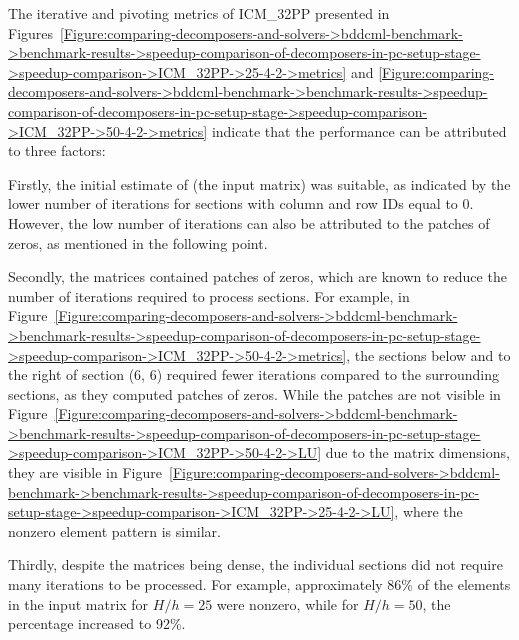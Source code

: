 The iterative and pivoting metrics of ICM\_32PP presented in Figures~\ref{Figure:comparing-decomposers-and-solvers->bddcml-benchmark->benchmark-results->speedup-comparison-of-decomposers-in-pc-setup-stage->speedup-comparison->ICM_32PP->25-4-2->metrics} and \ref{Figure:comparing-decomposers-and-solvers->bddcml-benchmark->benchmark-results->speedup-comparison-of-decomposers-in-pc-setup-stage->speedup-comparison->ICM_32PP->50-4-2->metrics} indicate that the performance can be attributed to three factors:

\begin{tight_enumerate}
	\item Firstly, the initial estimate of  (the input matrix) was suitable, as indicated by the lower number of iterations for sections with column and row IDs equal to 0.
However, the low number of iterations can also be attributed to the patches of zeros, as mentioned in the following point.
	\item Secondly, the matrices contained patches of zeros, which are known to reduce the number of iterations required to process sections.
For example, in Figure~\ref{Figure:comparing-decomposers-and-solvers->bddcml-benchmark->benchmark-results->speedup-comparison-of-decomposers-in-pc-setup-stage->speedup-comparison->ICM_32PP->50-4-2->metrics}, the sections below and to the right of section (6, 6) required fewer iterations compared to the surrounding sections, as they computed patches of zeros.
While the patches are not visible in Figure~\ref{Figure:comparing-decomposers-and-solvers->bddcml-benchmark->benchmark-results->speedup-comparison-of-decomposers-in-pc-setup-stage->speedup-comparison->ICM_32PP->50-4-2->LU} due to the matrix dimensions, they are visible in Figure~\ref{Figure:comparing-decomposers-and-solvers->bddcml-benchmark->benchmark-results->speedup-comparison-of-decomposers-in-pc-setup-stage->speedup-comparison->ICM_32PP->25-4-2->LU}, where the nonzero element pattern is similar.
	\item Thirdly, despite the matrices being dense, the individual sections did not require many iterations to be processed.
For example, approximately 86\% of the elements in the input matrix for $H/h = 25$ were nonzero, while for $H/h = 50$, the percentage increased to 92\%.
\end{tight_enumerate}


